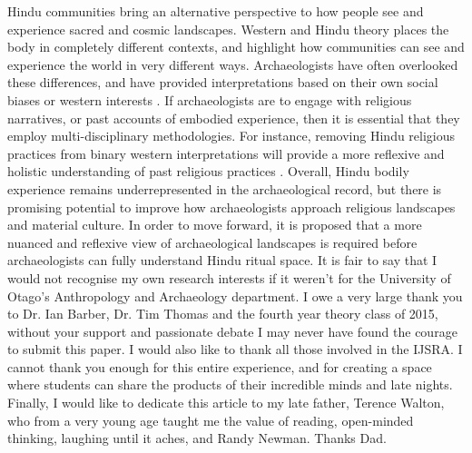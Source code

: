 	 Hindu communities bring an alternative perspective to how people see and experience sacred and cosmic landscapes. Western and Hindu theory places the body in completely different contexts, and highlight how communities can see and experience the world in very different ways. Archaeologists have often overlooked these differences, and have provided interpretations based on their own social biases or western interests \parencite {Sugandhi_2011}. If archaeologists are to engage with religious narratives, or past accounts of embodied experience, then it is essential that they employ multi-disciplinary methodologies. For instance, removing Hindu religious practices from binary western interpretations will provide a more reflexive and holistic understanding of past religious practices \parencites{Insoll_2004}{Insoll_2007}. Overall, Hindu bodily experience remains underrepresented in the archaeological record, but there is promising potential to improve how archaeologists approach religious landscapes and material culture. In order to move forward, it is proposed that a more nuanced and reflexive view of archaeological landscapes is required before archaeologists can fully understand Hindu ritual space.
	 \myseparator
	 It is fair to say that I would not recognise my own research interests if it weren’t for the University of Otago’s Anthropology and Archaeology department. I owe a very large thank you to Dr. Ian Barber, Dr. Tim Thomas and the fourth year theory class of 2015, without your support and passionate debate I may never have found the courage to submit this paper. I would also like to thank all those involved in the IJSRA. I cannot thank you enough for this entire experience, and for creating a space where students can share the products of their incredible minds and late nights. Finally, I would like to dedicate this article to my late father, Terence Walton, who from a very young age taught me the value of reading, open-minded thinking, laughing until it aches, and Randy Newman. Thanks Dad.
	
	


\printbibliography[heading=subbibnumbered] 
\label{Northwood:lastpage}
\closingarticle

